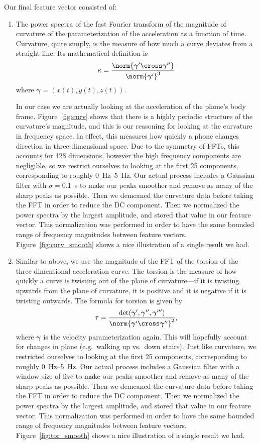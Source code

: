 Our final feature vector consisted of:
\begin{enumerate}
    \item The power spectra of the fast Fourier transform of the magnitude of curvature of the parameterization of the acceleration as a function of time. Curvature, quite simply, is the measure of how much a curve deviates from a straight line. Its mathematical definition is \[ {\kappa} = \frac{\norm{\boldsymbol{\gamma}' \cross \boldsymbol{\gamma}''}}{\norm{\boldsymbol\gamma'}^3} \] where $\boldsymbol{\gamma} = (x(t), y(t), z(t))$. 
    
    In our case we are actually looking at the acceleration of the phone's body frame. Figure~\ref{fig:curv} shows that there is a highly periodic structure of the curvature's magnitude, and this is our reasoning for looking at the curvature in frequency space. In effect, this measures how quickly a phone changes direction in three-dimensional space. Due to the symmetry of FFTs, this accounts for 128 dimensions, however the high frequency components are negligible, so we restrict ourselves to looking at the first 25 components, corresponding to roughly \SIrange{0}{5}{\Hz}. Our actual process includes a Gaussian filter with $\sigma = $\SI{0.1}{s} to make our peaks smoother and remove as many of the sharp peaks as possible. Then we demeaned the curvature data before taking the FFT in order to reduce the DC component. Then we normalized the power spectra by the largest amplitude, and stored that value in our feature vector. This normalization was performed in order to have the same bounded range of frequency magnitudes between feature vectors. Figure~\ref{fig:curv_smooth} shows a nice illustration of a single result we had.  
    
    \item Similar to above, we use the magnitude of the FFT of the torsion of the three-dimensional acceleration curve. The torsion is the measure of how quickly a curve is twisting out of the plane of curvature---if it is twisting upwards from the plane of curvature, it is positive and it is negative if it is twisting outwards. The formula for torsion is given by \[ \tau = \frac{\det(\boldsymbol{\gamma}', \boldsymbol{\gamma}'', \boldsymbol{\gamma}''')}{\norm{\boldsymbol{\gamma}' \cross \boldsymbol{\gamma}''}^2}, \] where $\boldsymbol{\gamma}$ is the velocity parameterization again. This will hopefully account for changes in plane (e.g.\ walking up vs.\ down stairs). Just like curvature, we restricted ourselves to looking at the first 25 components, corresponding to roughly \SIrange{0}{5}{\Hz}. Our actual process includes a Gaussian filter with a window size of five to make our peaks smoother and remove as many of the sharp peaks as possible. Then we demeaned the curvature data before taking the FFT in order to reduce the DC component. Then we normalized the power spectra by the largest amplitude, and stored that value in our feature vector. This normalization was performed in order to have the same bounded range of frequency magnitudes between feature vectors. Figure~\ref{fig:tor_smooth} shows a nice illustration of a single result we had.
    

\end{enumerate}
